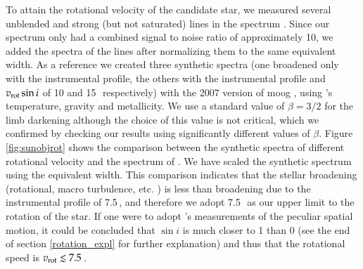 To attain the rotational velocity of the candidate star, we measured
several unblended and strong (but not saturated)  lines in the
spectrum \citep{1974lafl.book.....W}. Since our spectrum only had a
combined signal to noise ratio of approximately 10, we added the
spectra of the lines after normalizing them to the same equivalent
width. As a reference we created three synthetic spectra (one broadened only with the instrumental profile, the others with the instrumental profile and $v_{\rm{rot}}\sin{i}$ of 10 and 15\,\kms\ respectively) with the 2007 version of \gls{moog} \citep{1973ApJ...184..839S}, using \gh's temperature, gravity and metallicity.  We use a standard value of $\beta=3/2$ for the limb darkening although the choice
of this value is not critical, which we confirmed by checking our
results using significantly different values of $\beta$. Figure
\ref{fig:sunobjrot} shows the comparison between the synthetic spectra of different rotational velocity and the spectrum of \starg. We have scaled the synthetic spectrum using the equivalent width. This comparison indicates that the stellar broadening (rotational, macro turbulence, etc. ) is less than broadening due to the instrumental profile of 7.5\,\kms, and therefore we adopt 7.5\,\kms\ as our upper limit to the rotation of the star. If one were to adopt \rl's measurements of the
peculiar spatial motion, it could be concluded that $\sin{i}$ is much closer
to 1 than 0 (see the end of section \ref{rotation_expl} for further
explanation) and thus that the rotational speed is $v_{\rm rot} \lesssim 7.5$\,\kms.

